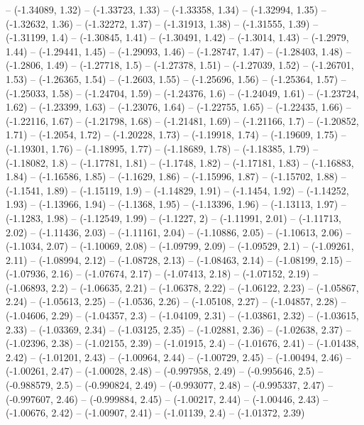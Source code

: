 -- (-1.34089, 1.32)
-- (-1.33723, 1.33)
-- (-1.33358, 1.34)
-- (-1.32994, 1.35)
-- (-1.32632, 1.36)
-- (-1.32272, 1.37)
-- (-1.31913, 1.38)
-- (-1.31555, 1.39)
-- (-1.31199, 1.4)
-- (-1.30845, 1.41)
-- (-1.30491, 1.42)
-- (-1.3014, 1.43)
-- (-1.2979, 1.44)
-- (-1.29441, 1.45)
-- (-1.29093, 1.46)
-- (-1.28747, 1.47)
-- (-1.28403, 1.48)
-- (-1.2806, 1.49)
-- (-1.27718, 1.5)
-- (-1.27378, 1.51)
-- (-1.27039, 1.52)
-- (-1.26701, 1.53)
-- (-1.26365, 1.54)
-- (-1.2603, 1.55)
-- (-1.25696, 1.56)
-- (-1.25364, 1.57)
-- (-1.25033, 1.58)
-- (-1.24704, 1.59)
-- (-1.24376, 1.6)
-- (-1.24049, 1.61)
-- (-1.23724, 1.62)
-- (-1.23399, 1.63)
-- (-1.23076, 1.64)
-- (-1.22755, 1.65)
-- (-1.22435, 1.66)
-- (-1.22116, 1.67)
-- (-1.21798, 1.68)
-- (-1.21481, 1.69)
-- (-1.21166, 1.7)
-- (-1.20852, 1.71)
-- (-1.2054, 1.72)
-- (-1.20228, 1.73)
-- (-1.19918, 1.74)
-- (-1.19609, 1.75)
-- (-1.19301, 1.76)
-- (-1.18995, 1.77)
-- (-1.18689, 1.78)
-- (-1.18385, 1.79)
-- (-1.18082, 1.8)
-- (-1.17781, 1.81)
-- (-1.1748, 1.82)
-- (-1.17181, 1.83)
-- (-1.16883, 1.84)
-- (-1.16586, 1.85)
-- (-1.1629, 1.86)
-- (-1.15996, 1.87)
-- (-1.15702, 1.88)
-- (-1.1541, 1.89)
-- (-1.15119, 1.9)
-- (-1.14829, 1.91)
-- (-1.1454, 1.92)
-- (-1.14252, 1.93)
-- (-1.13966, 1.94)
-- (-1.1368, 1.95)
-- (-1.13396, 1.96)
-- (-1.13113, 1.97)
-- (-1.1283, 1.98)
-- (-1.12549, 1.99)
-- (-1.1227, 2)
-- (-1.11991, 2.01)
-- (-1.11713, 2.02)
-- (-1.11436, 2.03)
-- (-1.11161, 2.04)
-- (-1.10886, 2.05)
-- (-1.10613, 2.06)
-- (-1.1034, 2.07)
-- (-1.10069, 2.08)
-- (-1.09799, 2.09)
-- (-1.09529, 2.1)
-- (-1.09261, 2.11)
-- (-1.08994, 2.12)
-- (-1.08728, 2.13)
-- (-1.08463, 2.14)
-- (-1.08199, 2.15)
-- (-1.07936, 2.16)
-- (-1.07674, 2.17)
-- (-1.07413, 2.18)
-- (-1.07152, 2.19)
-- (-1.06893, 2.2)
-- (-1.06635, 2.21)
-- (-1.06378, 2.22)
-- (-1.06122, 2.23)
-- (-1.05867, 2.24)
-- (-1.05613, 2.25)
-- (-1.0536, 2.26)
-- (-1.05108, 2.27)
-- (-1.04857, 2.28)
-- (-1.04606, 2.29)
-- (-1.04357, 2.3)
-- (-1.04109, 2.31)
-- (-1.03861, 2.32)
-- (-1.03615, 2.33)
-- (-1.03369, 2.34)
-- (-1.03125, 2.35)
-- (-1.02881, 2.36)
-- (-1.02638, 2.37)
-- (-1.02396, 2.38)
-- (-1.02155, 2.39)
-- (-1.01915, 2.4)
-- (-1.01676, 2.41)
-- (-1.01438, 2.42)
-- (-1.01201, 2.43)
-- (-1.00964, 2.44)
-- (-1.00729, 2.45)
-- (-1.00494, 2.46)
-- (-1.00261, 2.47)
-- (-1.00028, 2.48)
-- (-0.997958, 2.49)
-- (-0.995646, 2.5)
-- (-0.988579, 2.5)
-- (-0.990824, 2.49)
-- (-0.993077, 2.48)
-- (-0.995337, 2.47)
-- (-0.997607, 2.46)
-- (-0.999884, 2.45)
-- (-1.00217, 2.44)
-- (-1.00446, 2.43)
-- (-1.00676, 2.42)
-- (-1.00907, 2.41)
-- (-1.01139, 2.4)
-- (-1.01372, 2.39)
